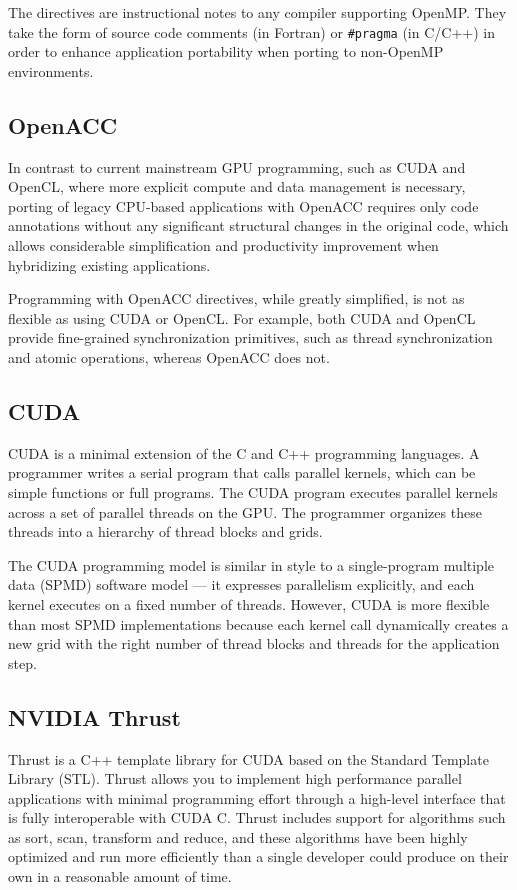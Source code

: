 \documentclass[12pt,a4paper]{article}
\begin{document}
The directives are instructional notes to any compiler supporting OpenMP. They take the form of
source code comments (in Fortran) or \texttt{\#pragma} (in C/C++) in order to enhance application
portability when porting to non-OpenMP environments. \cite{chandra2000}

\subsection{OpenACC}

In contrast to current mainstream GPU programming, such as CUDA and OpenCL, where more
explicit compute and data management is necessary, porting of legacy CPU-based applications with
OpenACC requires only code annotations without any significant structural changes in the original
code, which allows considerable simplification and productivity improvement when hybridizing
existing applications.

Programming with OpenACC directives, while greatly simplified, is not as flexible as using CUDA
or OpenCL. For example, both CUDA and OpenCL provide fine-grained synchronization
primitives, such as thread synchronization and atomic operations, whereas OpenACC does not. \cite{hoshino}

\subsection{CUDA}

CUDA is a minimal extension of the C and C++ programming languages. A programmer writes a
serial program that calls parallel kernels, which can be simple functions or full programs. The CUDA
program executes parallel kernels across a set of parallel threads on the GPU. The programmer
organizes these threads into a hierarchy of thread blocks and grids.

The CUDA programming model is similar in style to a single-program multiple data (SPMD)
software model --- it expresses parallelism explicitly, and each kernel executes on a fixed number of
threads. However, CUDA is more flexible than most SPMD implementations because each kernel
call dynamically creates a new grid with the right number of thread blocks and threads for the
application step.

\subsection{NVIDIA Thrust}

Thrust is a C++ template library for CUDA based on the Standard Template Library (STL). Thrust
allows you to implement high performance parallel applications with minimal programming effort
through a high-level interface that is fully interoperable with CUDA C. Thrust includes support for
algorithms such as sort, scan, transform and reduce, and these algorithms have been highly optimized
and run more efficiently than a single developer could produce on their own in a reasonable amount
of time.
\end{document}
